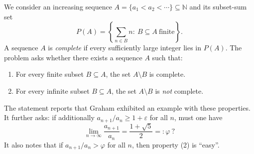 We consider an increasing sequence $A=\{a_1<a_2<\cdots\}\subseteq\mathbb{N}$ and its subset-sum set
\[
P(A)=\left\{\sum_{n\in B} n:\ B\subseteq A\ \text{finite}\right\}.
\]
A sequence $A$ is \emph{complete} if every sufficiently large integer lies in $P(A)$.
The problem asks whether there exists a sequence $A$ such that:
\begin{enumerate}
\item[(1)] For every finite subset $B\subseteq A$, the set $A\setminus B$ is complete.
\item[(2)] For every infinite subset $B\subseteq A$, the set $A\setminus B$ is \emph{not} complete.
\end{enumerate}
The statement reports that Graham exhibited an example with these properties.
It further asks: if additionally $a_{n+1}/a_n\ge 1+\varepsilon$ for all $n$, must one have
\[
\lim_{n\to\infty}\frac{a_{n+1}}{a_n}=\frac{1+\sqrt5}{2}=:\varphi\ ?
\]
It also notes that if $a_{n+1}/a_n>\varphi$ for all $n$, then property (2) is ``easy''.
